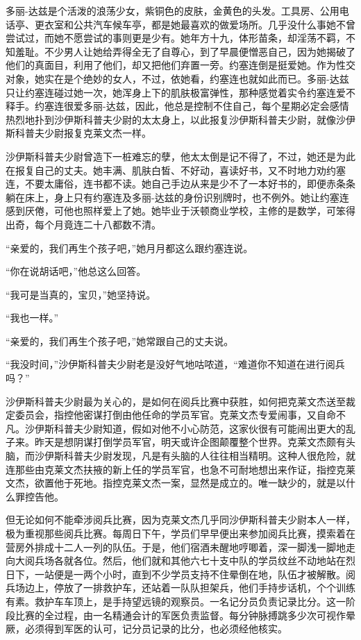     多丽-达兹是个活泼的浪荡少女，紫铜色的皮肤，金黄色的头发。工具房、公用电话亭、更衣室和公共汽车候车亭，都是她最喜欢的做爱场所。几乎没什么事她不曾尝试过，而她不愿尝试的事则更是少有。她年方十九，体形苗条，却淫荡不羁，不知羞耻。不少男人让她给弄得全无了自尊心，到了早晨便憎恶自己，因为她揭破了他们的真面目，利用了他们，却又把他们弃置一旁。约塞连倒是挺爱她。作为性交对象，她实在是个绝妙的女人，不过，依她看，约塞连也就如此而已。多丽-达兹只让约塞连碰过她一次，她浑身上下的肌肤极富弹性，那种感觉着实令约塞连爱不释手。约塞连很爱多丽-达兹，因此，他总是控制不住自己，每个星期必定会感情热烈地扑到沙伊斯科普夫少尉的太太身上，以此报复沙伊斯科普夫少尉，就像沙伊斯科普夫少尉报复克莱文杰一样。

 


    沙伊斯科普夫少尉曾造下一桩难忘的孽，他太太倒是记不得了，不过，她还是为此在报复自己的丈夫。她丰满、肌肤白皙、不好动，喜读好书，又不时地力劝约塞连，不要太庸俗，连书都不读。她自己手边从来是少不了一本好书的，即便赤条条躺在床上，身上只有约塞连及多丽-达兹的身份识别牌时，也不例外。她让约塞连感到厌倦，可他也照样爱上了她。她毕业于沃顿商业学校，主修的是数学，可笨得出奇，每个月竟连二十八都数不清。

    “亲爱的，我们再生个孩子吧，”她月月都这么跟约塞连说。

    “你在说胡话吧，”他总这么回答。

    “我可是当真的，宝贝，”她坚持说。

    “我也一样。”

    “亲爱的，我们再生个孩子吧，”她常跟自己的丈夫说。

    “我没时间，”沙伊斯科普夫少尉老是没好气地咕哝道，“难道你不知道在进行阅兵吗？”

    沙伊斯科普夫少尉最为关心的，是如何在阅兵比赛中获胜，如何把克莱文杰送至裁定委员会，指控他密谋打倒由他任命的学员军官。克莱文杰专爱闹事，又自命不凡。沙伊斯科普夫少尉知道，假如对他不小心防范，这家伙很有可能闹出更大的乱子来。昨天是想阴谋打倒学员军官，明天或许企图颠覆整个世界。克莱文杰颇有头脑，而沙伊斯科普夫少尉发现，凡是有头脑的人往往相当精明。这种人很危险，就连那些由克莱文杰扶掖的新上任的学员军官，也急不可耐地想出来作证，指控克莱文杰，欲置他于死地。指控克莱文杰一案，显然是成立的。唯一缺少的，就是以什么罪控告他。

    但无论如何不能牵涉阅兵比赛，因为克莱文杰几乎同沙伊斯科普夫少尉本人一样，极为重视那些阅兵比赛。每周日下午，学员们早早便出来参加阅兵比赛，摸索着在营房外排成十二人一列的队伍。于是，他们宿酒未醒地哼唧着，深一脚浅一脚地走向大阅兵场各就各位。然后，他们就和其他六七十支中队的学员纹丝不动地站在烈日下，一站便是一两个小时，直到不少学员支持不住晕倒在地，队伍才被解散。阅兵场边上，停放了一排救护车，还站着一队队担架兵，他们手持步话机，个个训练有素。救护车车顶上，是手持望远镜的观察员。一名记分员负责记录比分。这一阶段比赛的全过程，由一名精通会计的军医负责监督。每分钟脉搏跳多少次可视作晕厥，必须得到军医的认可，记分员记录的比分，也必须经他核实。
 


